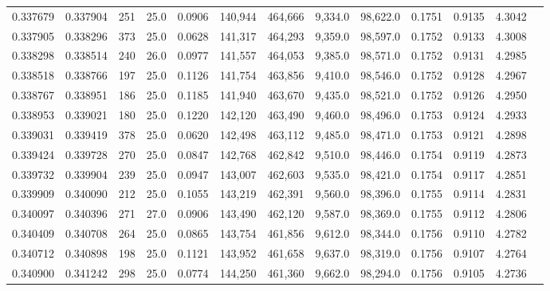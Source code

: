 \begin{tabular}{rrrrrrrrrrrrr}
0.337679 & 0.337904 &   251 & 25.0 &                                     0.0906 & 140,944 & 464,666 &   9,334.0 &  98,622.0 & 0.1751 & 0.9135 & 4.3042 \\
0.337905 & 0.338296 &   373 & 25.0 &                                     0.0628 & 141,317 & 464,293 &   9,359.0 &  98,597.0 & 0.1752 & 0.9133 & 4.3008 \\
0.338298 & 0.338514 &   240 & 26.0 &                                     0.0977 & 141,557 & 464,053 &   9,385.0 &  98,571.0 & 0.1752 & 0.9131 & 4.2985 \\
0.338518 & 0.338766 &   197 & 25.0 &                                     0.1126 & 141,754 & 463,856 &   9,410.0 &  98,546.0 & 0.1752 & 0.9128 & 4.2967 \\
0.338767 & 0.338951 &   186 & 25.0 &                                     0.1185 & 141,940 & 463,670 &   9,435.0 &  98,521.0 & 0.1752 & 0.9126 & 4.2950 \\
0.338953 & 0.339021 &   180 & 25.0 &                                     0.1220 & 142,120 & 463,490 &   9,460.0 &  98,496.0 & 0.1753 & 0.9124 & 4.2933 \\
0.339031 & 0.339419 &   378 & 25.0 &                                     0.0620 & 142,498 & 463,112 &   9,485.0 &  98,471.0 & 0.1753 & 0.9121 & 4.2898 \\
0.339424 & 0.339728 &   270 & 25.0 &                                     0.0847 & 142,768 & 462,842 &   9,510.0 &  98,446.0 & 0.1754 & 0.9119 & 4.2873 \\
0.339732 & 0.339904 &   239 & 25.0 &                                     0.0947 & 143,007 & 462,603 &   9,535.0 &  98,421.0 & 0.1754 & 0.9117 & 4.2851 \\
0.339909 & 0.340090 &   212 & 25.0 &                                     0.1055 & 143,219 & 462,391 &   9,560.0 &  98,396.0 & 0.1755 & 0.9114 & 4.2831 \\
0.340097 & 0.340396 &   271 & 27.0 &                                     0.0906 & 143,490 & 462,120 &   9,587.0 &  98,369.0 & 0.1755 & 0.9112 & 4.2806 \\
0.340409 & 0.340708 &   264 & 25.0 &                                     0.0865 & 143,754 & 461,856 &   9,612.0 &  98,344.0 & 0.1756 & 0.9110 & 4.2782 \\
0.340712 & 0.340898 &   198 & 25.0 &                                     0.1121 & 143,952 & 461,658 &   9,637.0 &  98,319.0 & 0.1756 & 0.9107 & 4.2764 \\
0.340900 & 0.341242 &   298 & 25.0 &                                     0.0774 & 144,250 & 461,360 &   9,662.0 &  98,294.0 & 0.1756 & 0.9105 & 4.2736 \\

\end{tabular}
